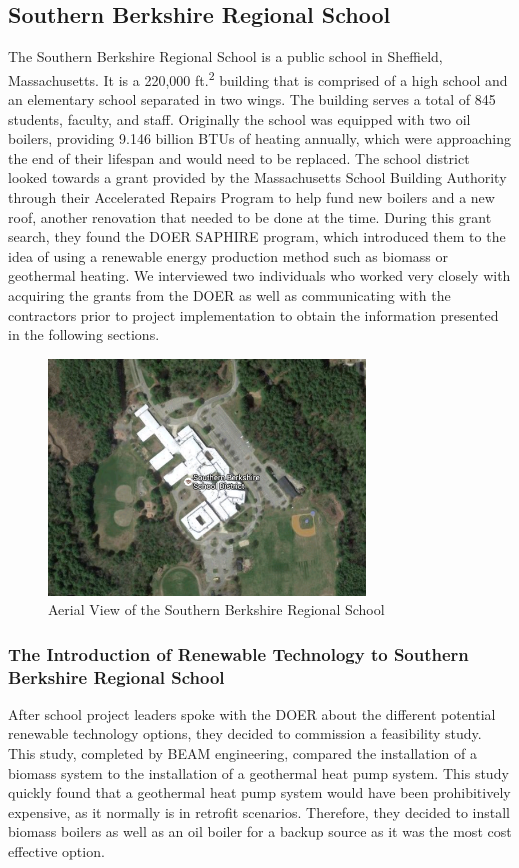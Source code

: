 \subsection{Southern Berkshire Regional School}
\par The Southern Berkshire Regional School is a public school in Sheffield, Massachusetts. It is a 220,000 ft.\textsuperscript{2} building that is comprised of a high school and an elementary school separated in two wings. The building serves a total of 845 students, faculty, and staff. Originally the school was equipped with two oil boilers, providing 9.146 billion BTUs of heating annually, which were approaching the end of their lifespan and would need to be replaced. The school district looked towards a grant provided by the Massachusetts School Building Authority through their Accelerated Repairs Program to help fund new boilers and a new roof, another renovation that needed to be done at the time. During this grant search, they found the DOER SAPHIRE program, which introduced them to the idea of using a renewable energy production method such as biomass or geothermal heating. We interviewed two individuals who worked very closely with acquiring the grants from the DOER as well as communicating with the contractors prior to project implementation to obtain the information presented in the following sections.
\begin{figure}[H]
\centering
\includegraphics[width=0.75\textwidth]{findingschapter/southernberkshireschool}
\caption{Aerial View of the Southern Berkshire Regional School}
\end{figure}

\subsubsection{The Introduction of Renewable Technology to Southern Berkshire Regional School}
\par After school project leaders spoke with the DOER about the different potential renewable technology options, they decided to commission a feasibility study. This study, completed by BEAM engineering, compared the installation of a biomass system to the installation of a geothermal heat pump system. This study quickly found that a geothermal heat pump system would have been prohibitively expensive, as it normally is in retrofit scenarios.  Therefore, they decided to install biomass boilers as well as an oil boiler for a backup source as it was the most cost effective option.

